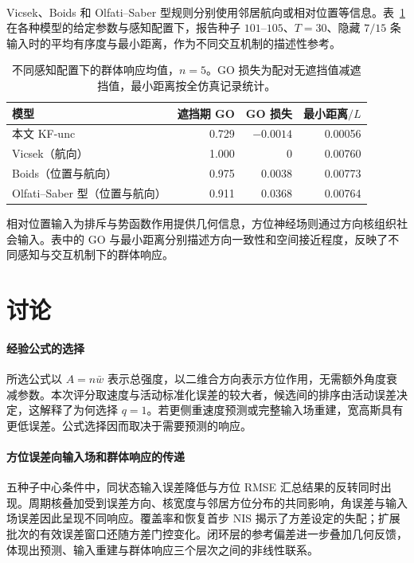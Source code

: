\documentclass[UTF8,fontset=windows,11pt]{ctexart}
\newcommand{\upcite}[1]{\textsuperscript{\cite{#1}}}
\begin{document}
Vicsek、Boids 和 Olfati--Saber 型规则分别使用邻居航向或相对位置等信息\upcite{Vicsek1995,Reynolds1987,OlfatiSaber2006}。表~\ref{tab:mainstream} 在各种模型的给定参数与感知配置下，报告种子 $101$--$105$、$T=30$、隐藏 $7/15$ 条输入时的平均有序度与最小距离，作为不同交互机制的描述性参考。

\begin{table}[!tbp]
\centering\small
\caption{不同感知配置下的群体响应均值，$n=5$。GO 损失为配对无遮挡值减遮挡值，最小距离按全仿真记录统计。}
\label{tab:mainstream}
\begin{tabular}{lrrr}
\toprule 模型 & 遮挡期 GO & GO 损失 & 最小距离$/L$\\\midrule
本文 KF-unc & 0.729 & $-0.0014$ & 0.00056\\
Vicsek（航向） & 1.000 & 0 & 0.00760\\
Boids（位置与航向） & 0.975 & 0.0038 & 0.00773\\
Olfati--Saber 型（位置与航向） & 0.911 & 0.0368 & 0.00764\\\bottomrule
\end{tabular}
\end{table}

相对位置输入为排斥与势函数作用提供几何信息，方位神经场则通过方向核组织社会输入。表中的 GO 与最小距离分别描述方向一致性和空间接近程度，反映了不同感知与交互机制下的群体响应。





\section{讨论}

\paragraph{经验公式的选择}
所选公式以 $A=n\bar w$ 表示总强度，以二维合方向表示方位作用，无需额外角度衰减参数。本次评分取速度与活动标准化误差的较大者，候选间的排序由活动误差决定，这解释了为何选择 $q=1$。若更侧重速度预测或完整输入场重建，宽高斯具有更低误差。公式选择因而取决于需要预测的响应。

\paragraph{方位误差向输入场和群体响应的传递}
五种子中心条件中，同状态输入误差降低与方位 RMSE 汇总结果的反转同时出现。周期核叠加受到误差方向、核宽度与邻居方位分布的共同影响，角误差与输入场误差因此呈现不同响应。覆盖率和恢复首步 NIS 揭示了方差设定的失配；扩展批次的有效误差窗口还随方差门控变化。闭环层的参考偏差进一步叠加几何反馈，体现出预测、输入重建与群体响应三个层次之间的非线性联系。
\end{document}
